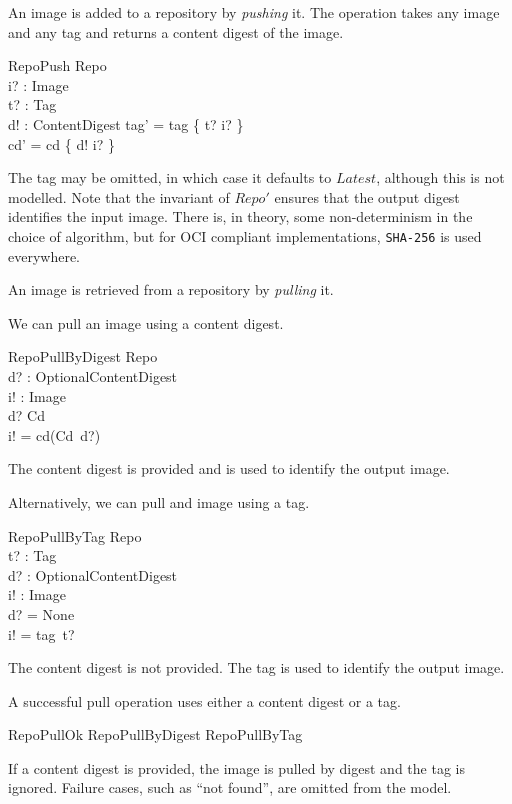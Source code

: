 \documentclass[a4paper,twoside,12pt]{article}
\begin{document}
An image is added to a repository by \textit{pushing} it. The operation takes any image and any tag and returns a content digest of the image.
\begin{schema}{RepoPush}
  \Delta Repo \\
  i? : Image \\
  t? : Tag \\
  d! : ContentDigest
\where
  tag' = tag \oplus \{ t? \mapsto i? \} \\
  cd' = cd \oplus \{ d! \mapsto i? \} \\
\end{schema}
The tag may be omitted, in which case it defaults to $Latest$, although this is not modelled. Note that the invariant of $Repo'$ ensures that the output digest identifies the input image. There is, in theory, some non-determinism in the choice of algorithm, but for OCI compliant implementations, \texttt{SHA-256} is used everywhere.

\newpage
An image is retrieved from a repository by \textit{pulling} it.

We can pull an image using a content digest.
\begin{schema}{RepoPullByDigest}
  \Xi Repo \\
  d? : OptionalContentDigest \\
  i! : Image \\
\where
  d? \in \dom Cd \\
  i! = cd(Cd~d?) \\
\end{schema}
The content digest is provided and is used to identify the output image.

Alternatively, we can pull and image using a tag.
\begin{schema}{RepoPullByTag}
  \Xi Repo \\
  t? : Tag \\
  d? : OptionalContentDigest \\
  i! : Image \\
\where
  d? = None \\
  i! = tag~t? \\
\end{schema}
The content digest is not provided. The tag is used to identify the output image.

A successful pull operation uses either a content digest or a tag.
\begin{zed}
  RepoPullOk  RepoPullByDigest \lor RepoPullByTag
\end{zed}
If a content digest is provided, the image is pulled by digest and the tag is ignored. Failure cases, such as ``not found'', are omitted from the model.
\end{document}
